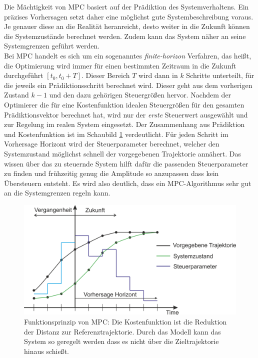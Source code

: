 \documentclass{like}
\begin{document}
Die Mächtigkeit von \ac{MPC} basiert auf der Prädiktion des Systemverhaltens. Ein präzises Vorhersagen setzt daher eine möglichst gute Systembeschreibung voraus. Je genauer diese an die Realität heranreicht, desto weiter in die Zukunft können die Systemzustände berechnet werden. Zudem kann das System näher an seine Systemgrenzen geführt werden. \\
Bei \acl{MPC} handelt es sich um ein sogenanntes \textit{finite-horizon} Verfahren, das heißt, die Optimierung wird immer für einen bestimmten Zeitraum in die Zukunft durchgeführt $ [t_0, t_0 + T] $. Dieser Bereich \(T\) wird dann in \(k\) Schritte unterteilt, für die jeweils ein Prädiktionsschritt berechnet wird. Dieser geht aus dem vorherigen Zustand $k -1$ und den dazu gehörigen Steuergrößen hervor. Nachdem der Optimierer die für eine Kostenfunktion idealen Steuergrößen für den gesamten Prädiktionsvektor berechnet hat, wird nur der \emph{erste} Steuerwert ausgewählt und zur Regelung im realen System eingesetzt. Der Zusammenhang aus Prädiktion und Kostenfunktion ist im Schaubild \ref{fig:mpcTheory} verdeutlicht. Für jeden Schritt im Vorhersage Horizont wird der Steuerparameter berechnet, welcher den Systemzustand möglichst schnell der vorgegebenen Trajektorie annähert. Das wissen über das zu steuernde System hilft dafür die passenden Steuerparameter zu finden und frühzeitig genug die Amplitude so anzupassen dass kein Übersteuern entsteht. Es wird also deutlich, dass ein \ac{MPC}-Algorithmus sehr gut an die Systemgrenzen regeln kann.

\begin{figure}[ht!]
	\centering
	\includegraphics[width=350pt]{Abbildungen/mpcParadigm.png}
	\caption{Funktionsprinzip von \ac{MPC}: Die Kostenfunktion ist die Reduktion der Distanz zur Referenztrajektorie. Durch das Modell kann das System so geregelt werden dass es nicht über die Zieltrajektorie hinaus schießt.}
	\label{fig:mpcTheory}
\end{figure}
\end{document}
